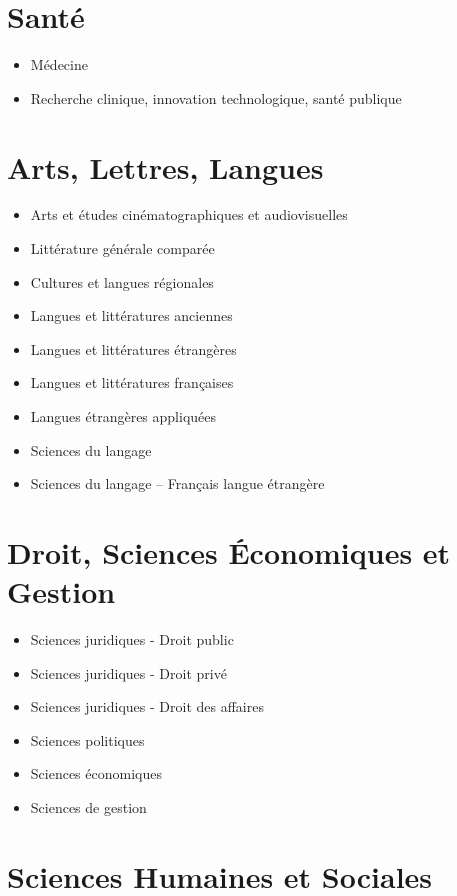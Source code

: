 \documentclass[
  a4paper, %
  11pt, extrafontsizes, %
  onecolumn, %
  openright, %
]{memoir}
\begin{document}
\section{Santé}

\begin{itemize}
  \item Médecine
  \item Recherche clinique, innovation technologique, santé publique 
\end{itemize}	


\section{Arts, Lettres, Langues}

\begin{itemize}
  \item Arts et études cinématographiques et audiovisuelles
  \item Littérature générale comparée
  \item Cultures et langues régionales 
  \item Langues et littératures anciennes 
  \item Langues et littératures étrangères 
  \item Langues et littératures françaises 
  \item Langues étrangères appliquées 
  \item Sciences du langage 
  \item Sciences du langage – Français langue étrangère
\end{itemize}	


\section{Droit, Sciences Économiques et Gestion}

\begin{itemize}
  \item Sciences juridiques - Droit public
  \item Sciences juridiques - Droit privé 
  \item Sciences juridiques - Droit des affaires
  \item Sciences politiques 
  \item Sciences économiques
  \item Sciences de gestion
\end{itemize}	


\section{Sciences Humaines et Sociales}
\end{document}
